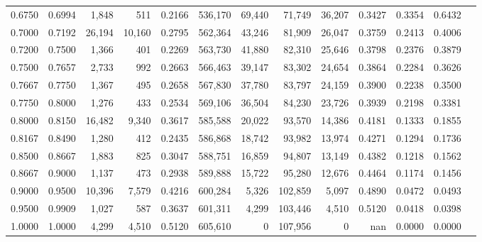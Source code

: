 \begin{tabular}{rrrrrrrrrrrrr}
0.6750 & 0.6994 &  1,848 &    511 &                                     0.2166 & 536,170 &  69,440 &  71,749 &  36,207 & 0.3427 & 0.3354 & 0.6432 \\
0.7000 & 0.7192 & 26,194 & 10,160 &                                     0.2795 & 562,364 &  43,246 &  81,909 &  26,047 & 0.3759 & 0.2413 & 0.4006 \\
0.7200 & 0.7500 &  1,366 &    401 &                                     0.2269 & 563,730 &  41,880 &  82,310 &  25,646 & 0.3798 & 0.2376 & 0.3879 \\
0.7500 & 0.7657 &  2,733 &    992 &                                     0.2663 & 566,463 &  39,147 &  83,302 &  24,654 & 0.3864 & 0.2284 & 0.3626 \\
0.7667 & 0.7750 &  1,367 &    495 &                                     0.2658 & 567,830 &  37,780 &  83,797 &  24,159 & 0.3900 & 0.2238 & 0.3500 \\
0.7750 & 0.8000 &  1,276 &    433 &                                     0.2534 & 569,106 &  36,504 &  84,230 &  23,726 & 0.3939 & 0.2198 & 0.3381 \\
0.8000 & 0.8150 & 16,482 &  9,340 &                                     0.3617 & 585,588 &  20,022 &  93,570 &  14,386 & 0.4181 & 0.1333 & 0.1855 \\
0.8167 & 0.8490 &  1,280 &    412 &                                     0.2435 & 586,868 &  18,742 &  93,982 &  13,974 & 0.4271 & 0.1294 & 0.1736 \\
0.8500 & 0.8667 &  1,883 &    825 &                                     0.3047 & 588,751 &  16,859 &  94,807 &  13,149 & 0.4382 & 0.1218 & 0.1562 \\
0.8667 & 0.9000 &  1,137 &    473 &                                     0.2938 & 589,888 &  15,722 &  95,280 &  12,676 & 0.4464 & 0.1174 & 0.1456 \\
0.9000 & 0.9500 & 10,396 &  7,579 &                                     0.4216 & 600,284 &   5,326 & 102,859 &   5,097 & 0.4890 & 0.0472 & 0.0493 \\
0.9500 & 0.9909 &  1,027 &    587 &                                     0.3637 & 601,311 &   4,299 & 103,446 &   4,510 & 0.5120 & 0.0418 & 0.0398 \\
1.0000 & 1.0000 &  4,299 &  4,510 &                                     0.5120 & 605,610 &       0 & 107,956 &       0 &    nan & 0.0000 & 0.0000 \\
\bottomrule
\end{tabular}
